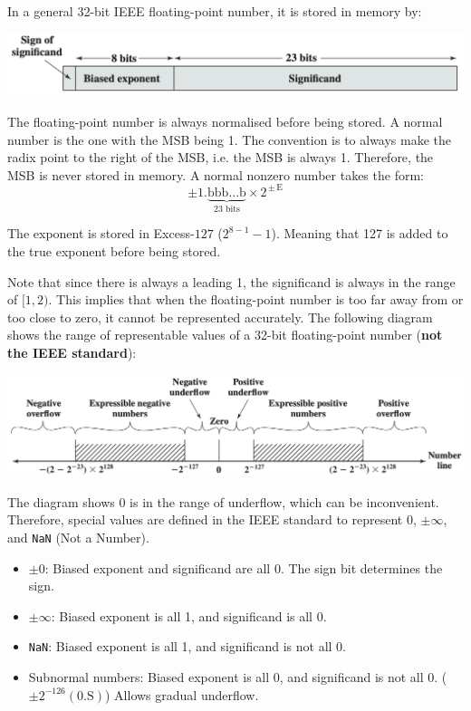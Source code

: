 In a general 32-bit IEEE floating-point number, it is stored in memory by:

\begin{center}
    \includegraphics[scale=0.5]{chaps/number-representation/32-bit-ieee-float.png}
\end{center}

The floating-point number is always normalised before being stored. A normal number is the one
with the MSB being 1. The convention is to always make the radix point to the right of the MSB,
i.e. the MSB is always 1. Therefore, the MSB is never stored in memory. A normal nonzero number
takes the form:
\[\pm 1.\underbrace{\text{bbb}\ldots\text{b}}_{\text{23 bits}}\times 2^{\,\pm\,\text{E}}\]

The exponent is stored in Excess-$127$ ($2^{8-1} - 1$). Meaning that 127 is added to the true
exponent before being stored.

Note that since there is always a leading 1, the significand is always in the range of $[1, 2)$.
This implies that when the floating-point number is too far away from or too close to zero, it
cannot be represented accurately. The following diagram shows the range of representable values
of a 32-bit floating-point number (\textbf{not the IEEE standard}):

\begin{center}
    \includegraphics[scale=0.5]{chaps/number-representation/32-bit-ieee-float-range.png}
\end{center}

The diagram shows 0 is in the range of underflow, which can be inconvenient. Therefore, special
values are defined in the IEEE standard
to represent 0, $\pm\infty$, and \texttt{NaN} (Not a Number).
\begin{itemize}
    \item $\pm0$: Biased exponent and significand are all 0. The sign bit determines the sign.
    \item $\pm\infty$: Biased exponent is all 1, and significand is all 0.
    \item \texttt{NaN}: Biased exponent is all 1, and significand is not all 0.
    \item Subnormal numbers: Biased exponent is all 0, and significand is not all 0.
        ($\pm 2^{-126}(0.\text{S})$) Allows gradual underflow.
\end{itemize}


